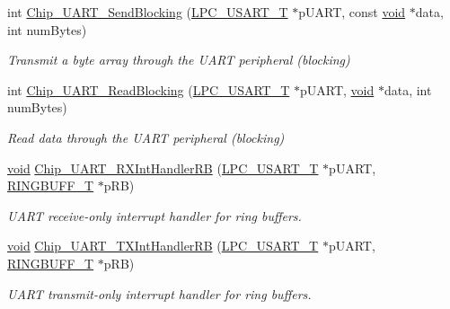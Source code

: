 \begin{DoxyCompactItemize}
int \hyperlink{group__UART__17XX__40XX_gad2e45d820abdd0e1790ebd61938c100a}{Chip\-\_\-\-U\-A\-R\-T\-\_\-\-Send\-Blocking} (\hyperlink{structLPC__USART__T}{L\-P\-C\-\_\-\-U\-S\-A\-R\-T\-\_\-\-T} $\ast$p\-U\-A\-R\-T, const \hyperlink{Paradigm_2Tern__EE_2small_2portmacro_8h_a14d32f8130d3c0b212cfc751730b5b49}{void} $\ast$data, int num\-Bytes)
\begin{DoxyCompactList}\small\item\em Transmit a byte array through the U\-A\-R\-T peripheral (blocking) \end{DoxyCompactList}\item 
int \hyperlink{group__UART__17XX__40XX_ga2b256d39f2fde9f8b923a2f341f5fea3}{Chip\-\_\-\-U\-A\-R\-T\-\_\-\-Read\-Blocking} (\hyperlink{structLPC__USART__T}{L\-P\-C\-\_\-\-U\-S\-A\-R\-T\-\_\-\-T} $\ast$p\-U\-A\-R\-T, \hyperlink{Paradigm_2Tern__EE_2small_2portmacro_8h_a14d32f8130d3c0b212cfc751730b5b49}{void} $\ast$data, int num\-Bytes)
\begin{DoxyCompactList}\small\item\em Read data through the U\-A\-R\-T peripheral (blocking) \end{DoxyCompactList}\item 
\hyperlink{Paradigm_2Tern__EE_2small_2portmacro_8h_a14d32f8130d3c0b212cfc751730b5b49}{void} \hyperlink{group__UART__17XX__40XX_gafdd19a312a2bed6ff1ccb47d5b68c248}{Chip\-\_\-\-U\-A\-R\-T\-\_\-\-R\-X\-Int\-Handler\-R\-B} (\hyperlink{structLPC__USART__T}{L\-P\-C\-\_\-\-U\-S\-A\-R\-T\-\_\-\-T} $\ast$p\-U\-A\-R\-T, \hyperlink{structRINGBUFF__T}{R\-I\-N\-G\-B\-U\-F\-F\-\_\-\-T} $\ast$p\-R\-B)
\begin{DoxyCompactList}\small\item\em U\-A\-R\-T receive-\/only interrupt handler for ring buffers. \end{DoxyCompactList}\item 
\hyperlink{Paradigm_2Tern__EE_2small_2portmacro_8h_a14d32f8130d3c0b212cfc751730b5b49}{void} \hyperlink{group__UART__17XX__40XX_ga74df5e39960a1535118fcfe2fbe90d30}{Chip\-\_\-\-U\-A\-R\-T\-\_\-\-T\-X\-Int\-Handler\-R\-B} (\hyperlink{structLPC__USART__T}{L\-P\-C\-\_\-\-U\-S\-A\-R\-T\-\_\-\-T} $\ast$p\-U\-A\-R\-T, \hyperlink{structRINGBUFF__T}{R\-I\-N\-G\-B\-U\-F\-F\-\_\-\-T} $\ast$p\-R\-B)
\begin{DoxyCompactList}\small\item\em U\-A\-R\-T transmit-\/only interrupt handler for ring buffers. \end{DoxyCompactList}\item 

\end{DoxyCompactItemize}
